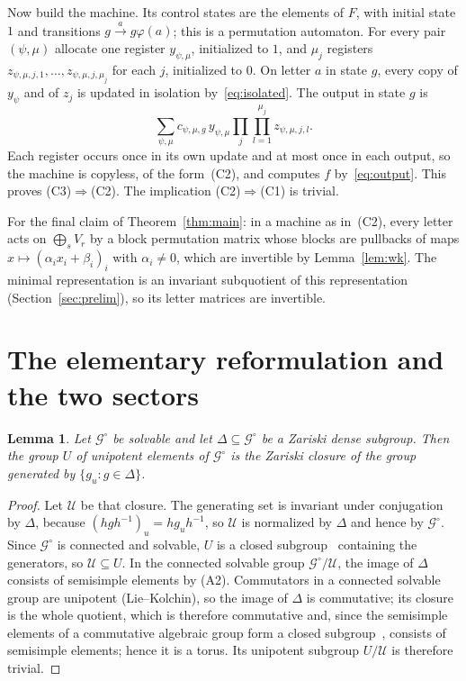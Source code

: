 \documentclass[11pt,letterpaper]{article}
\newcommand{\cG}{\mathcal{G}}
\newtheorem{lemma}[theorem]{Lemma}
\theoremstyle{definition}
\begin{document}
Now build the machine. Its control states are the elements of $F$, with initial state $1$ and transitions $g\xrightarrow{a}g\varphi(a)$; this is a permutation automaton. For every pair $(\psi,\mu)$ allocate one register $y_{\psi,\mu}$, initialized to $1$, and $\mu_j$ registers $z_{\psi,\mu,j,1},\ldots,z_{\psi,\mu,j,\mu_j}$ for each $j$, initialized to $0$. On letter $a$ in state $g$, every copy of $y_\psi$ and of $z_j$ is updated in isolation by~\eqref{eq:isolated}. The output in state $g$ is
\[
\sum_{\psi,\mu}c_{\psi,\mu,g}\,y_{\psi,\mu}\prod_j\prod_{l=1}^{\mu_j}z_{\psi,\mu,j,l}.
\]
Each register occurs once in its own update and at most once in each output, so the machine is copyless, of the form~(C2), and computes $f$ by~\eqref{eq:output}. This proves (C3)$\Rightarrow$(C2). The implication (C2)$\Rightarrow$(C1) is trivial.

For the final claim of Theorem~\ref{thm:main}: in a machine as in~(C2), every letter acts on $\bigoplus_{s}V_r$ by a block permutation matrix whose blocks are pullbacks of maps $x\mapsto(\alpha_ix_i+\beta_i)_i$ with $\alpha_i\ne0$, which are invertible by Lemma~\ref{lem:wk}. The minimal representation is an invariant subquotient of this representation (Section~\ref{sec:prelim}), so its letter matrices are invertible.

\label{end:core}
\clearpage
\appendix
{}
\renewcommand{\thetheorem}{\thesection.\arabic{theorem}}
\renewcommand{\theHtheorem}{app.\thesection.\arabic{theorem}}
\section{The elementary reformulation and the two sectors}\label{sec:sectors}
\begin{lemma}\label{lem:Ugen}
Let $\cG^\circ$ be solvable and let $\Delta\subseteq\cG^\circ$ be a Zariski dense subgroup. Then the group $U$ of unipotent elements of $\cG^\circ$ is the Zariski closure of the group generated by $\{g_u:g\in\Delta\}$.
\end{lemma}
\begin{proof}
Let $\mathcal U$ be that closure. The generating set is invariant under conjugation by $\Delta$, because $(hgh^{-1})_u=hg_uh^{-1}$, so $\mathcal U$ is normalized by $\Delta$ and hence by $\cG^\circ$. Since $\cG^\circ$ is connected and solvable, $U$ is a closed subgroup~\cite[10.6]{Bor91} containing the generators, so $\mathcal U\subseteq U$. In the connected solvable group $\cG^\circ/\mathcal U$, the image of $\Delta$ consists of semisimple elements by (A2). Commutators in a connected solvable group are unipotent (Lie--Kolchin), so the image of $\Delta$ is commutative; its closure is the whole quotient, which is therefore commutative and, since the semisimple elements of a commutative algebraic group form a closed subgroup~\cite{Bor91}, consists of semisimple elements; hence it is a torus. Its unipotent subgroup $U/\mathcal U$ is therefore trivial.
\end{proof}
\end{document}
